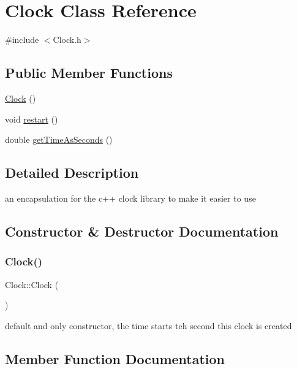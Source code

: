 \hypertarget{classClock}{}\section{Clock Class Reference}
\label{classClock}


{\ttfamily \#include $<$Clock.\+h$>$}

\subsection*{Public Member Functions}
\begin{DoxyCompactItemize}
\item 
\hyperlink{classClock_adbc370eb6b5f8d01645cf440188160a8}{Clock} ()
\item 
void \hyperlink{classClock_a775bf97123b58c768571868341d28b08}{restart} ()
\item 
double \hyperlink{classClock_af7e4352c60e4268d43a0489dfb541c9f}{get\+Time\+As\+Seconds} ()
\end{DoxyCompactItemize}


\subsection{Detailed Description}
an encapsulation for the c++ clock library to make it easier to use 

\subsection{Constructor \& Destructor Documentation}
\mbox{\label{classClock_adbc370eb6b5f8d01645cf440188160a8}} 
\subsubsection{\texorpdfstring{Clock()}{Clock()}}
{\footnotesize\ttfamily Clock\+::\+Clock (\begin{DoxyParamCaption}{ }\end{DoxyParamCaption})}

default and only constructor, the time starts teh second this clock is created 

\subsection{Member Function Documentation}
\mbox{\label{classClock_af7e4352c60e4268d43a0489dfb541c9f}} 

